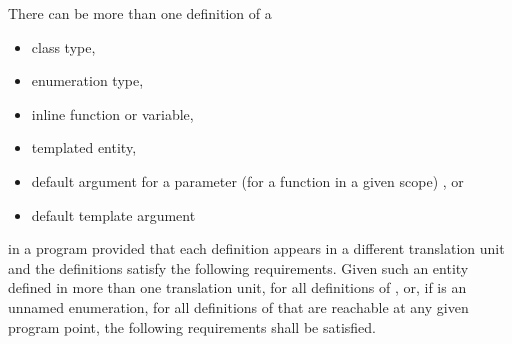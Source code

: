 \pnum
There can be more than one definition of a
\begin{itemize}
\item class type,
\item enumeration type,
\item inline function or variable,
\item templated entity,
\item default argument for a parameter (for a function in a given scope)%
, or
\item default template argument
\end{itemize}
in a program provided that
each definition appears in a different translation unit and
the definitions satisfy the following requirements.
Given such an entity  defined in more than one translation unit,
for all definitions of , or,
if  is an unnamed enumeration,
for all definitions of  that are reachable at any given program point,
the following requirements shall be satisfied.
